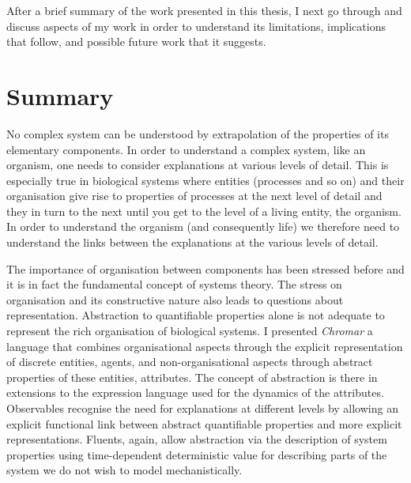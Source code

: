 After a brief summary of the work presented in this thesis, I next go through
and discuss aspects of my work in order to understand its limitations,
implications that follow, and possible future work that it suggests.

\section{Summary}
No complex system can be understood by extrapolation of the properties of its
elementary components. In order to understand a complex system, like an
organism, one needs to consider explanations at various levels of detail. This
is especially true in biological systems where entities (processes and so on)
and their organisation give rise to properties of processes at the next level of
detail and they in turn to the next until you get to the level of a living
entity, the organism. In order to understand the organism (and consequently
life) we therefore need to understand the links between the explanations at the
various levels of detail.

The importance of organisation between components has been stressed before and
it is in fact the fundamental concept of systems theory. The stress on
organisation and its constructive nature also leads to questions about
representation. Abstraction to quantifiable properties alone is not adequate to
represent the rich organisation of biological systems. I presented
\emph{Chromar} a language that combines organisational aspects through the
explicit representation of discrete entities, agents, and non-organisational
aspects through abstract properties of these entities, attributes. The concept
of abstraction is there in extensions to the expression language used for the
dynamics of the attributes. Observables recognise the need for explanations at
different levels by allowing an explicit functional link between abstract
quantifiable properties and more explicit representations. Fluents, again, allow
abstraction via the description of system properties using time-dependent
deterministic value for describing parts of the system we do not wish to model
mechanistically.

